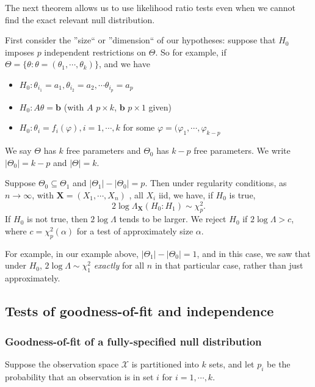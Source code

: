 \documentclass[a4paper]{article}
\begin{document}
The next theorem allows us to use likelihood ratio tests even when we cannot find the exact relevant null distribution.

First consider the ''size`` or ''dimension`` of our hypotheses: suppose that $H_0$ imposes $p$ independent restrictions on $\Theta$. So for example, if $\Theta = \{\theta: \theta = (\theta_1, \cdots, \theta_k)\}$, and we have
\begin{itemize}
  \item $H_0: \theta_{i_1} = a_1, \theta_{i_2} = a_2, \cdots \theta_{i_p} = a_p$
  \item $H_0: A\theta = \mathbf{b}$ (with $A$ $p\times k$, $\mathbf{b}$ $p\times 1$ given)
  \item $H_0: \theta_i = f_i(\varphi), i = 1, \cdots, k$ for some $\varphi = (\varphi_1, \cdots, \varphi_{k - p}$
\end{itemize}
We say $\Theta$ has $k$ free parameters and $\Theta_0$ has $k - p$ free parameters. We write $|\Theta_0| = k - p$ and $|\Theta| = k$.

\begin{thm}
  Suppose $\Theta_0 \subseteq \Theta_1$ and $|\Theta_1| - |\Theta_0| = p$. Then under regularity conditions, as $n\to \infty$, with $\mathbf{X} = (X_1, \cdots, X_n)$ , all $X_i$ iid, we have, if $H_0$ is true,
  \[
    2\log \Lambda_\mathbf{X}(H_0:H_1)\sim \chi_p^2.
  \]
  If $H_0$ is not true, then $2\log \Lambda$ tends to be larger. We reject $H_0$ if $2\log \Lambda > c$, where $c = \chi_p^2(\alpha)$ for a test of approximately size $\alpha$.
\end{thm}

For example, in our example above, $|\Theta_1| - |\Theta_0| = 1$, and in this case, we saw that under $H_0$, $2\log \Lambda \sim \chi_1^2$ \emph{exactly} for all $n$ in that particular case, rather than just approximately.

\subsection{Tests of goodness-of-fit and independence}
\subsubsection{Goodness-of-fit of a fully-specified null distribution}
Suppose the observation space $\mathcal{X}$ is partitioned into $k$ sets, and let $p_i$ be the probability that an observation is in set $i$ for $i = 1, \cdots, k$.
\end{document}

